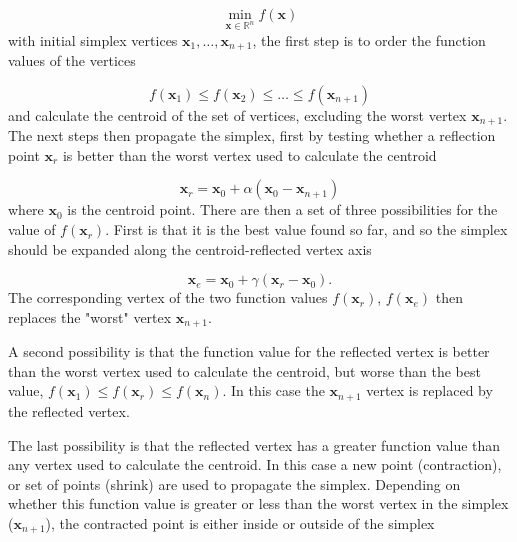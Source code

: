 \begin{equation}
\min_{\mathbf{x} \in \mathbb{R}^n} f\left( \mathbf{x} \right)
\end{equation}
%
with initial simplex vertices $\mathbf{x}_1, \dots, \mathbf{x}_{n+1}$, the first 
step is to order the function values of the vertices

\begin{equation}
f\left(\mathbf{x}_1\right) \leq f\left(\mathbf{x}_2\right) \leq \dots \leq f\left(\mathbf{x}_{n+1}\right)
\end{equation}
%
and calculate the centroid of the set of vertices, excluding the worst vertex 
$\mathbf{x}_{n+1}$. The next steps then propagate the simplex, first by testing 
whether a reflection point $\mathbf{x}_r$ is better than the worst vertex used to
calculate the centroid

\begin{equation}
\mathbf{x}_r = \mathbf{x}_0 + \alpha\left(\mathbf{x}_0 - \mathbf{x}_{n+1}\right) 
\end{equation}
%
where $\mathbf{x}_0$ is the centroid point. There are then a set of three possibilities
for the value of $f\left(\mathbf{x}_r\right)$. First is that it is the best value
found so far, and so the simplex should be expanded along the centroid-reflected 
vertex axis

\begin{equation}
\mathbf{x}_e = \mathbf{x}_0 + \gamma\left(\mathbf{x}_r - \mathbf{x}_0 \right).
\end{equation}
%
The corresponding vertex of the two function values $f\left(\mathbf{x}_r\right)$, 
$f\left(\mathbf{x}_e\right)$ then replaces the "worst" vertex $\mathbf{x}_{n+1}$.

A second possibility is that the function value for the reflected vertex is better
than the worst vertex used to calculate the centroid, but worse than the best 
value, $f\left(\mathbf{x}_1\right) \leq f\left(\mathbf{x}_r\right) \leq f\left(\mathbf{x}_n\right)$.
In this case the $\mathbf{x}_{n+1}$ vertex is replaced by the reflected vertex.

The last possibility is that the reflected vertex has a greater function value than
any vertex used to calculate the centroid. In this case a new point (contraction),
or set of points (shrink) are used to propagate the simplex. Depending on whether
this function value is greater or less than the worst vertex in the simplex ($\mathbf{x}_{n+1}$),
the contracted point is either inside or outside of the simplex

